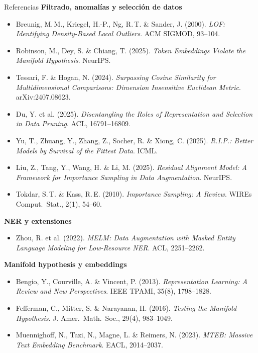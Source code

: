 \begin{frame}[allowframebreaks]{Referencias}
\textbf{Filtrado, anomalías y selección de datos}
\begin{itemize}\setlength\itemsep{0pt}
  \item Breunig, M.\,M., Kriegel, H.-P., Ng, R.\,T. \& Sander, J. (2000). \textit{LOF: Identifying Density-Based Local Outliers}. ACM SIGMOD, 93--104.
  \item Robinson, M., Dey, S. \& Chiang, T. (2025). \textit{Token Embeddings Violate the Manifold Hypothesis}. NeurIPS.
  \item Tessari, F. \& Hogan, N. (2024). \textit{Surpassing Cosine Similarity for Multidimensional Comparisons: Dimension Insensitive Euclidean Metric}. arXiv:2407.08623.
  \item Du, Y. et al. (2025). \textit{Disentangling the Roles of Representation and Selection in Data Pruning}. ACL, 16791--16809.
  \item Yu, T., Zhuang, Y., Zhang, Z., Socher, R. \& Xiong, C. (2025). \textit{R.I.P.: Better Models by Survival of the Fittest Data}. ICML.
  \item Liu, Z., Tang, Y., Wang, H. \& Li, M. (2025). \textit{Residual Alignment Model: A Framework for Importance Sampling in Data Augmentation}. NeurIPS.
  \item Tokdar, S.\,T. \& Kass, R.\,E. (2010). \textit{Importance Sampling: A Review}. WIREs Comput.\ Stat., 2(1), 54--60.
\end{itemize}

\textbf{NER y extensiones}
\begin{itemize}\setlength\itemsep{0pt}
  \item Zhou, R. et al. (2022). \textit{MELM: Data Augmentation with Masked Entity Language Modeling for Low-Resource NER}. ACL, 2251--2262.
\end{itemize}

\textbf{Manifold hypothesis y embeddings}
\begin{itemize}\setlength\itemsep{0pt}
  \item Bengio, Y., Courville, A. \& Vincent, P. (2013). \textit{Representation Learning: A Review and New Perspectives}. IEEE TPAMI, 35(8), 1798--1828.
  \item Fefferman, C., Mitter, S. \& Narayanan, H. (2016). \textit{Testing the Manifold Hypothesis}. J. Amer.\ Math.\ Soc., 29(4), 983--1049.
  \item Muennighoff, N., Tazi, N., Magne, L. \& Reimers, N. (2023). \textit{MTEB: Massive Text Embedding Benchmark}. EACL, 2014--2037.
\end{itemize}
\end{frame}
